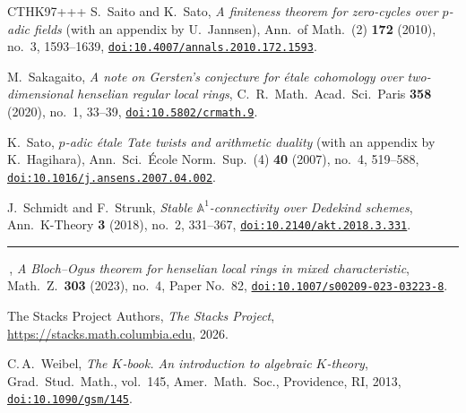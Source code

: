 \documentclass[10pt,a4paper]{article}
\providecommand{\bysame}{\rule[.5ex]{3em}{.3pt}\,}
\providecommand{\doi}[2][]{\href{https://doi.org/#2}{\nolinkurl{doi:#2}}}
\numberwithin{equation}{section}
\newtheorem{Key lemma}[theorem]{Key lemma}
\theoremstyle{definition}
\theoremstyle{remark}
\begin{document}
\begin{thebibliography}{CTHK97+++}
S.~Saito and K.~Sato, \emph{A finiteness theorem for zero-cycles over
  {$p$}-adic fields} (with an appendix by U.~Jannsen), Ann.\ of Math.~(2) \textbf{172} (2010), no.~3, 1593--1639, \doi{10.4007/annals.2010.172.1593}.

M.~Sakagaito, \emph{A note on {G}ersten's conjecture for \'{e}tale cohomology
  over two-dimensional henselian regular local rings}, C.~R.~Math.\ Acad.\ Sci.\
Paris \textbf{358} (2020), no.~1, 33--39, \href{https://doi.org/10.5802/crmath.9}{\texttt{doi:10.5802/\allowbreak crmath.9}}.

K.~Sato, \emph{{$p$}-adic \'etale {T}ate twists and arithmetic duality} (with an appendix by K.~Hagihara), Ann.\ Sci.\ \'Ecole Norm.\ Sup.~(4) \textbf{40} (2007), no.~4, 519--588, \doi{10.1016/j.ansens.2007.04.002}.

J.~Schmidt and F.~Strunk, \emph{Stable {$\mathbb A^1$}-connectivity over
  {D}edekind schemes}, Ann.\ K-Theory \textbf{3} (2018), no.~2, 331--367,
  \doi{10.2140/akt.2018.3.331}.

\bysame, \emph{A {Bloch}--{Ogus} theorem for henselian local rings in mixed
  characteristic}, Math.~Z.\ \textbf{303} (2023), no.~4, Paper No.~82,
  \doi{10.1007/s00209-023-03223-8}.

The {Stacks Project Authors}, \emph{The Stacks Project},
  \url{https://stacks.math.columbia.edu}, 2026.

C.\,A.~Weibel, \emph{The {$K$}-book. An introduction to algebraic $K$-theory}, Grad.\ Stud.\ Math.,  vol.~145, Amer.\ Math.\ Soc., Providence, RI, 2013, \doi{10.1090/gsm/145}.

\end{thebibliography}
\end{document}
